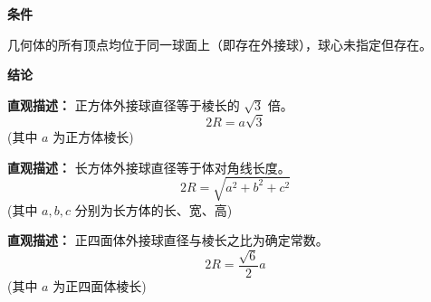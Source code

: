 \begin{statementbox}
	\textbf{\textcolor{CStatement}{条件}}
	\begin{description}[style=nextline, leftmargin=2.8em, labelsep=0.5em, itemsep=0.35em]
		\item[\textbf{\textcolor{CStatement}{条件1（球内接几何体）：}}] 几何体的所有顶点均位于同一球面上（即存在外接球），球心未指定但存在。
	\end{description}

	\textbf{\textcolor{CStatement}{结论}}
	\begin{description}[style=nextline, leftmargin=2.8em, labelsep=0.5em, itemsep=0.45em]
		\item[\textbf{\textcolor{CStatement}{结论一（正方体）：}}]
			\textbf{\textcolor{CStatement}{直观描述：}}
			正方体外接球直径等于棱长的 $\sqrt{3}$ 倍。
			\[
				2R = a\sqrt{3}
			\]
			(其中 $a$ 为正方体棱长)

		\item[\textbf{\textcolor{CStatement}{结论二（长方体）：}}]
			\textbf{\textcolor{CStatement}{直观描述：}}
			长方体外接球直径等于体对角线长度。
			\[
				2R = \sqrt{a^{2} + b^{2} + c^{2}}
			\]
			(其中 $a,b,c$ 分别为长方体的长、宽、高)

		\item[\textbf{\textcolor{CStatement}{推广结论（正四面体）：}}]
			\textbf{\textcolor{CStatement}{直观描述：}}
			正四面体外接球直径与棱长之比为确定常数。
			\[
				2R = \frac{\sqrt{6}}{2}a
			\]
			(其中 $a$ 为正四面体棱长)
	\end{description}
\end{statementbox}
